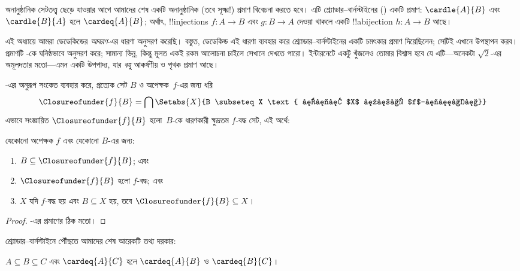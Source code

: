 \documentclass[../../../include/open-logic-section]{subfiles}
\begin{document}


অনানুষ্ঠানিক সেটতত্ত্ব ছেড়ে যাওয়ার আগে আমাদের শেষ একটি অনানুষ্ঠানিক (তবে সূক্ষ্ম!) প্রমাণ বিবেচনা করতে হবে। এটি শ্র্যোডার--বার্নস্টাইনের () একটি প্রমাণ: $\cardle{A}{B}$ এবং $\cardle{B}{A}$ হলে $\cardeq{A}{B}$; অর্থাৎ, !!{injection}s $f \colon A \to B$ এবং $g \colon B \to A$ দেওয়া থাকলে একটি !!a{bijection} $h \colon A \to B$ আছে।

এই অধ্যায়ে আমরা ডেডেকিন্ডের \emph{আবরণ}-এর ধারণা অনুসরণ করেছি। বস্তুত, ডেডেকিন্ড এই ধারণা ব্যবহার করে শ্র্যোডার--বার্নস্টাইনের একটি চমৎকার প্রমাণ দিয়েছিলেন; সেটিই এখানে উপস্থাপন করব। প্রমাণটি \citet[pp.~157--8]{Potter2004}-কে ঘনিষ্ঠভাবে অনুসরণ করে; সামান্য ভিন্ন, কিন্তু মূলত একই রকম আলোচনা চাইলে সেখানে দেখতে পারো। ইন্টারনেটে একটু খুঁজলেও তোমার বিশ্বাস হবে যে এটি—অনেকটা $\sqrt{2}$-এর অমূলদতার মতো—এমন একটি উপপাদ্য, যার \emph{বহু} আকর্ষণীয় ও পৃথক প্রমাণ আছে।

-এর অনুরূপ সংকেত ব্যবহার করে, প্রত্যেক সেট $B$ ও অপেক্ষক~$f$-এর জন্য ধরি
\[
\Closureofunder{f}{B} = \bigcap \Setabs{X}{B \subseteq X
\text{ এবং $X$ হলো $f$-বদ্ধ}}
\]
এভাবে সংজ্ঞায়িত $\Closureofunder{f}{B}$ হলো~$B$-কে ধারণকারী ক্ষুদ্রতম $f$-বদ্ধ সেট, এই অর্থে:

\begin{lem}
	যেকোনো অপেক্ষক $f$ এবং যেকোনো $B$-এর জন্য:
	\begin{enumerate}
		\item{} $B \subseteq \Closureofunder{f}{B}$; এবং
		\item{} $\Closureofunder{f}{B}$ হলো $f$-বদ্ধ; এবং
		\item{} $X$ যদি $f$-বদ্ধ হয় এবং $B
		\subseteq X$ হয়, তবে $\Closureofunder{f}{B} \subseteq X$।
	\end{enumerate}
\end{lem}

\begin{proof}
-এর প্রমাণের ঠিক মতো।
\end{proof}

শ্র্যোডার--বার্নস্টাইনে পৌঁছতে আমাদের শেষ আরেকটি তথ্য দরকার:

\begin{prop}
$A \subseteq B \subseteq C$ এবং $\cardeq{A}{C}$ হলে $\cardeq{A}{B}$ ও $\cardeq{B}{C}$।
\end{prop}
\end{document}
